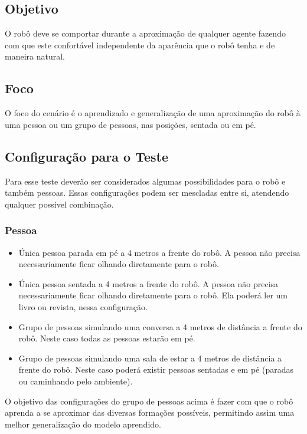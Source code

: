 \subsection{Objetivo}

O robô deve se comportar durante a aproximação de qualquer agente fazendo com que este confortável independente da aparência que o robô tenha e de maneira natural.

\subsection{Foco}

O foco do cenário é o aprendizado e generalização de uma aproximação do robô à uma pessoa ou um grupo de pessoas, nas posições, sentada ou em pé.

\subsection{Configuração para o Teste}

Para esse teste deverão ser considerados algumas possibilidades para o robô e também pessoas. Essas configurações podem ser mescladas entre si, atendendo qualquer possível combinação.

\subsubsection{Pessoa}

\begin{itemize}
	\item Única pessoa parada em pé a 4 metros a frente do robô. A pessoa não precisa necessariamente ficar olhando diretamente para o robô.
	\item Única pessoa sentada a 4 metros a frente do robô. A pessoa não precisa necessariamente ficar olhando diretamente para o robô. Ela poderá ler um livro ou revista, nessa configuração.
	\item Grupo de pessoas simulando uma conversa a 4 metros de distância a frente do robô. Neste caso todas as pessoas estarão em pé.
	\item Grupo de pessoas simulando uma sala de estar a 4 metros de distância a frente do robô. Neste caso poderá existir pessoas sentadas e em pé (paradas ou caminhando pelo ambiente).
\end{itemize}

O objetivo das configurações do grupo de pessoas acima é fazer com que o robô aprenda a se aproximar das diversas formações possíveis, permitindo assim uma melhor generalização do modelo aprendido.

